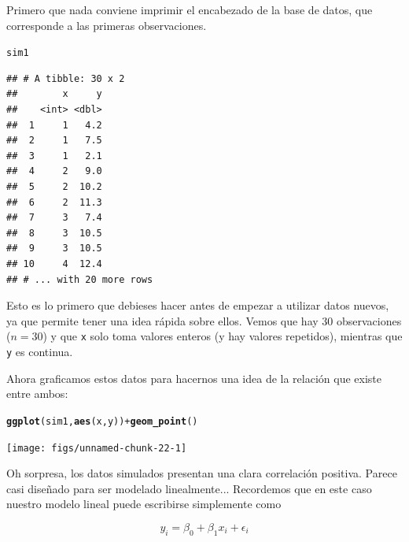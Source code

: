 \documentclass{article}\usepackage[]{graphicx}\usepackage[]{color}
\makeatletter
\newcommand{\hlopt}[1]{\textcolor[rgb]{0,0,0}{#1}}%
\newcommand{\hlstd}[1]{\textcolor[rgb]{0.345,0.345,0.345}{#1}}%
\newcommand{\hlkwd}[1]{\textcolor[rgb]{0.737,0.353,0.396}{\textbf{#1}}}%
\newenvironment{kframe}{%
 \def\at@end@of@kframe{}%
 \ifinner\ifhmode%
  \def\at@end@of@kframe{\end{minipage}}%
  \begin{minipage}{\columnwidth}%
 \fi\fi%
 \def\FrameCommand##1{\hskip\@totalleftmargin \hskip-\fboxsep
 \colorbox{shadecolor}{##1}\hskip-\fboxsep
     \hskip-\linewidth \hskip-\@totalleftmargin \hskip\columnwidth}%
 \MakeFramed {\advance\hsize-\width
   \@totalleftmargin\z@ \linewidth\hsize
   \@setminipage}}%
 {\par\unskip\endMakeFramed%
 \at@end@of@kframe}
\newenvironment{knitrout}{}{} %
\makeatother
\begin{document}
Primero que nada conviene imprimir el encabezado de la base de datos, que corresponde a las primeras observaciones.

\begin{knitrout}
\color{fgcolor}\begin{kframe}
\begin{alltt}
\hlstd{sim1}
\end{alltt}
\begin{verbatim}
## # A tibble: 30 x 2
##        x     y
##    <int> <dbl>
##  1     1   4.2
##  2     1   7.5
##  3     1   2.1
##  4     2   9.0
##  5     2  10.2
##  6     2  11.3
##  7     3   7.4
##  8     3  10.5
##  9     3  10.5
## 10     4  12.4
## # ... with 20 more rows
\end{verbatim}
\end{kframe}
\end{knitrout}

Esto es lo primero que debieses hacer antes de empezar a utilizar datos nuevos, ya que permite tener una idea rápida sobre ellos. Vemos que hay 30 observaciones ($n=30$) y que \verb|x| solo toma valores enteros (y hay valores repetidos), mientras que \verb|y| es continua.

Ahora graficamos estos datos para hacernos una idea de la relación que existe entre ambos:

\begin{knitrout}
\color{fgcolor}\begin{kframe}
\begin{alltt}
\hlkwd{ggplot}\hlstd{(sim1,} \hlkwd{aes}\hlstd{(x, y))} \hlopt{+} \hlkwd{geom_point}\hlstd{()}
\end{alltt}
\end{kframe}

{\centering \texttt{[image: figs/unnamed-chunk-22-1]} 

}



\end{knitrout}

Oh sorpresa, los datos simulados presentan una clara correlación positiva. Parece casi diseñado para ser modelado linealmente...
Recordemos que en este caso nuestro modelo lineal puede escribirse simplemente como

\begin{equation*}
y_i = \beta_0 + \beta_1 x_i + \epsilon_i 
\end{equation*}
\end{document}
